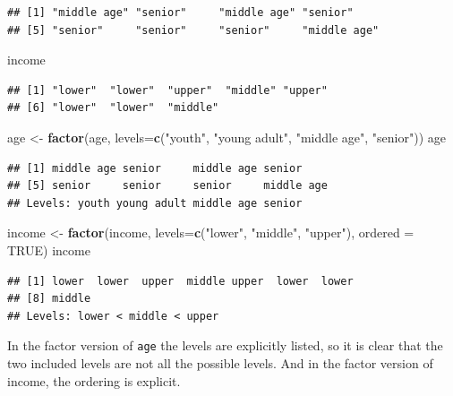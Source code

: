 \documentclass[
]{krantz}
\newenvironment{Shaded}{\begin{snugshade}}{\end{snugshade}}
\newcommand{\DataTypeTok}[1]{\textcolor[rgb]{0.13,0.29,0.53}{#1}}
\newcommand{\KeywordTok}[1]{\textcolor[rgb]{0.13,0.29,0.53}{\textbf{#1}}}
\newcommand{\NormalTok}[1]{#1}
\newcommand{\OtherTok}[1]{\textcolor[rgb]{0.56,0.35,0.01}{#1}}
\newcommand{\StringTok}[1]{\textcolor[rgb]{0.31,0.60,0.02}{#1}}
\begin{document}
\begin{verbatim}
## [1] "middle age" "senior"     "middle age" "senior"    
## [5] "senior"     "senior"     "senior"     "middle age"
\end{verbatim}

\begin{Shaded}
\begin{Highlighting}[]
\NormalTok{income}
\end{Highlighting}
\end{Shaded}

\begin{verbatim}
## [1] "lower"  "lower"  "upper"  "middle" "upper" 
## [6] "lower"  "lower"  "middle"
\end{verbatim}

\begin{Shaded}
\begin{Highlighting}[]
\NormalTok{age \textless{}{-}}\StringTok{ }\KeywordTok{factor}\NormalTok{(age, }\DataTypeTok{levels=}\KeywordTok{c}\NormalTok{(}\StringTok{"youth"}\NormalTok{, }\StringTok{"young adult"}\NormalTok{, }\StringTok{"middle age"}\NormalTok{,}
                            \StringTok{"senior"}\NormalTok{))}
\NormalTok{age}
\end{Highlighting}
\end{Shaded}

\begin{verbatim}
## [1] middle age senior     middle age senior    
## [5] senior     senior     senior     middle age
## Levels: youth young adult middle age senior
\end{verbatim}

\begin{Shaded}
\begin{Highlighting}[]
\NormalTok{income \textless{}{-}}\StringTok{ }\KeywordTok{factor}\NormalTok{(income, }\DataTypeTok{levels=}\KeywordTok{c}\NormalTok{(}\StringTok{"lower"}\NormalTok{, }\StringTok{"middle"}\NormalTok{, }\StringTok{"upper"}\NormalTok{),}
                 \DataTypeTok{ordered =} \OtherTok{TRUE}\NormalTok{)}
\NormalTok{income}
\end{Highlighting}
\end{Shaded}

\begin{verbatim}
## [1] lower  lower  upper  middle upper  lower  lower 
## [8] middle
## Levels: lower < middle < upper
\end{verbatim}

In the factor version of \texttt{age} the levels are explicitly listed, so it is clear that the two included levels are not all the possible levels. And in the factor version of income, the ordering is explicit.
\end{document}
